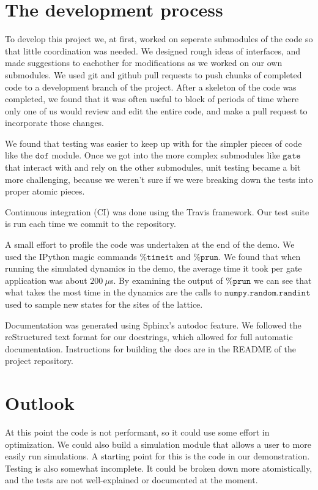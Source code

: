 \documentclass{article}
\begin{document}
\section{The development process}
To develop this project we, at first, worked on seperate submodules of the code so that little coordination was needed. We designed rough ideas of interfaces, and made suggestions to eachother for modifications as we worked on our own submodules. We used git and github pull requests to push chunks of completed code to a development branch of the project. After a skeleton of the code was completed, we found that it was often useful to block of periods of time where only one of us would review and edit the entire code, and make a pull request to incorporate those changes.

We found that testing was easier to keep up with for the simpler pieces of code like the $\texttt{dof}$ module. Once we got into the more complex submodules like $\texttt{gate}$ that interact with and rely on the other submodules, unit testing became a bit more challenging, because we weren't sure if we were breaking down the tests into proper atomic pieces.

Continuous integration (CI) was done using the Travis framework. Our test suite is run each time we commit to the repository.

A small effort to profile the code was undertaken at the end of the demo. We used the IPython magic commands $\texttt{\%timeit}$ and $\texttt{\%prun}$. We found that when running the simulated dynamics in the demo, the average time it took per gate application was about $200\ \mu$s. By examining the output of $\texttt{\%prun}$ we can see that what takes the most time in the dynamics are the calls to $\texttt{numpy.random.randint}$ used to sample new states for the sites of the lattice.

Documentation was generated using Sphinx's autodoc feature. We followed the reStructured text format for our docstrings, which allowed for full automatic documentation. Instructions for building the docs are in the README of the project repository.

\section{Outlook}
At this point the code is not performant, so it could use some effort in optimization. We could also build a simulation module that allows a user to more easily run simulations. A starting point for this is the code in our demonstration. Testing is also somewhat incomplete. It could be broken down more atomistically, and the tests are not well-explained or documented at the moment.
\end{document}
